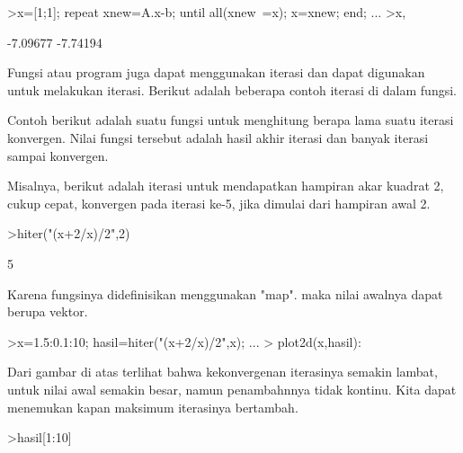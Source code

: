 \documentclass[a4paper,10pt]{article}
\begin{document}
\begin{eulernotebook}
\begin{eulercomment}
\begin{eulercomment}
\begin{eulercomment}
\begin{eulercomment}
\begin{eulercomment}
\begin{eulercomment}
\begin{eulerprompt}
>x=[1;1]; repeat xnew=A.x-b; until all(xnew~=x); x=xnew; end; ...
>x,
\end{eulerprompt}
\begin{euleroutput}
       -7.09677 
       -7.74194 
\end{euleroutput}
\begin{eulercomment}
Fungsi atau program juga dapat menggunakan iterasi dan dapat digunakan untuk melakukan iterasi. Berikut adalah beberapa contoh
iterasi di dalam fungsi.

Contoh berikut adalah suatu fungsi untuk menghitung berapa lama suatu iterasi konvergen. Nilai fungsi tersebut adalah hasil akhir
iterasi dan banyak iterasi sampai konvergen.
\end{eulercomment}
\begin{eulercomment}
Misalnya, berikut adalah iterasi untuk mendapatkan hampiran akar kuadrat 2, cukup cepat,
konvergen pada iterasi ke-5, jika dimulai dari hampiran awal 2.
\end{eulercomment}
\begin{eulerprompt}
>hiter("(x+2/x)/2",2)
\end{eulerprompt}
\begin{euleroutput}
  5
\end{euleroutput}
\begin{eulercomment}
Karena fungsinya didefinisikan menggunakan "map". maka nilai awalnya dapat berupa vektor.
\end{eulercomment}
\begin{eulerprompt}
>x=1.5:0.1:10; hasil=hiter("(x+2/x)/2",x); ...
>  plot2d(x,hasil):
\end{eulerprompt}
\begin{eulercomment}
Dari gambar di atas terlihat bahwa kekonvergenan iterasinya semakin lambat, untuk nilai awal
semakin besar, namun penambahnnya tidak kontinu. Kita dapat menemukan kapan maksimum
iterasinya bertambah.
\end{eulercomment}
\begin{eulerprompt}
>hasil[1:10]
\end{eulerprompt}
\begin{euleroutput}

\end{euleroutput}
\end{eulercomment}
\end{eulercomment}
\end{eulercomment}
\end{eulercomment}
\end{eulercomment}
\end{eulercomment}
\end{eulernotebook}
\end{document}
